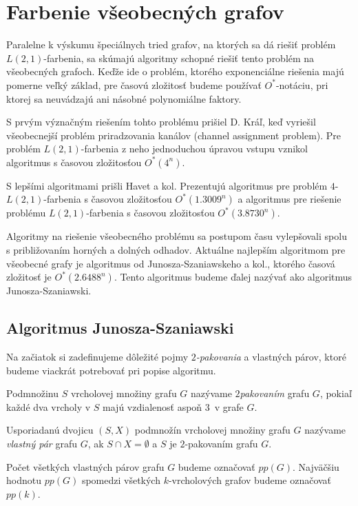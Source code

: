 \section{Farbenie všeobecných grafov}

Paralelne k výskumu špeciálnych tried grafov, na ktorých sa dá riešiť problém $L(2,1)$-farbenia,
sa skúmajú algoritmy schopné riešiť tento problém na všeobecných grafoch. Keďže ide o problém,
ktorého exponenciálne riešenia majú pomerne veľký základ, pre časovú zložitosť budeme používať
$O^*$-notáciu, pri ktorej sa neuvádzajú ani násobné polynomiálne faktory.

S prvým význačným riešením tohto problému prišiel D. Kráľ, keď vyriešil všeobecnejší problém
priradzovania kanálov (channel assignment problem). Pre problém $L(2,1)$-farbenia z neho 
jednoduchou úpravou vstupu vznikol algoritmus s časovou zložitosťou $O^*(4^n)$\cite{kral_channel}.

S lepšími algoritmami prišli Havet a kol. Prezentujú algoritmus pre problém $4$-$L(2,1)$-farbenia
s časovou zložitosťou $O^*(1.3009^n)$ a algoritmus pre riešenie problému $L(2,1)$-farbenia s
časovou zložitosťou $O^*(3.8730^n)$.

Algoritmy na riešenie všeobecného problému sa postupom času vylepšovali spolu s približovaním
horných a dolných odhadov. Aktuálne najlepším algoritmom pre všeobecné grafy je algoritmus
od Junosza-Szaniawskeho a kol., ktorého časová zložitosť je $O^*(2.6488^n)$\cite{junosza_fast}.
Tento algoritmus budeme ďalej nazývať ako algoritmus Junosza-Szaniawski.

\subsection{Algoritmus Junosza-Szaniawski}

Na začiatok si zadefinujeme dôležité pojmy $2$\emph{-pakovania} a vlastných párov, ktoré budeme
viackrát potrebovať pri popise algoritmu.

\begin{defn}
    Podmnožinu $S$ vrcholovej množiny grafu $G$ nazývame $2$\emph{pakovaním} grafu $G$, pokiaľ každé
    dva vrcholy v $S$ majú vzdialenosť aspoň $3$ v grafe $G$.
\end{defn}

\begin{defn}
    Usporiadanú dvojicu $(S, X)$ podmnožín vrcholovej množiny grafu $G$ nazývame \emph{vlastný pár}
    grafu $G$, ak $S \cap X = \emptyset$ a $S$ je $2$-pakovaním grafu $G$.

    Počet všetkých vlastných párov grafu $G$ budeme označovať $pp(G)$. Najväčšiu hodnotu $pp(G)$
    spomedzi všetkých $k$-vrcholových grafov budeme označovať $pp(k)$.
\end{defn}

